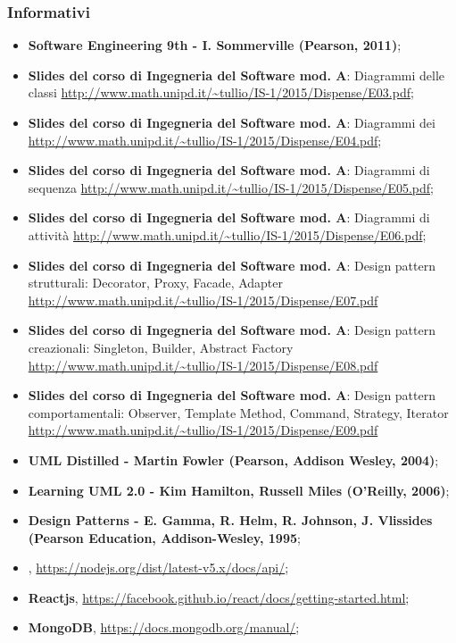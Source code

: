 \subsubsection{Informativi}
\begin{itemize}
\item \textbf{Software Engineering 9th - I. Sommerville (Pearson, 2011)};
\item \textbf{Slides del corso di Ingegneria del Software mod. A}: Diagrammi delle classi \url{http://www.math.unipd.it/~tullio/IS-1/2015/Dispense/E03.pdf};
\item \textbf{Slides del corso di Ingegneria del Software mod. A}: Diagrammi dei \url{http://www.math.unipd.it/~tullio/IS-1/2015/Dispense/E04.pdf};
\item \textbf{Slides del corso di Ingegneria del Software mod. A}: Diagrammi di sequenza \url{http://www.math.unipd.it/~tullio/IS-1/2015/Dispense/E05.pdf};
\item \textbf{Slides del corso di Ingegneria del Software mod. A}: Diagrammi di attività \url{http://www.math.unipd.it/~tullio/IS-1/2015/Dispense/E06.pdf};
\item \textbf{Slides del corso di Ingegneria del Software mod. A}: Design pattern strutturali: Decorator, Proxy, Facade, Adapter \url{http://www.math.unipd.it/~tullio/IS-1/2015/Dispense/E07.pdf}
\item \textbf{Slides del corso di Ingegneria del Software mod. A}: Design pattern creazionali: Singleton, Builder, Abstract Factory \url{http://www.math.unipd.it/~tullio/IS-1/2015/Dispense/E08.pdf}
\item \textbf{Slides del corso di Ingegneria del Software mod. A}: Design pattern comportamentali: Observer, Template Method, Command, Strategy, Iterator \url{http://www.math.unipd.it/~tullio/IS-1/2015/Dispense/E09.pdf}
\item \textbf{UML Distilled - Martin Fowler (Pearson, Addison Wesley, 2004)};
\item \textbf{Learning UML 2.0 - Kim Hamilton, Russell Miles (O’Reilly, 2006)};
\item \textbf{Design Patterns - E. Gamma, R. Helm, R. Johnson, J. Vlissides (Pearson Education, Addison-Wesley, 1995};
\item \textbf{}, \url{https://nodejs.org/dist/latest-v5.x/docs/api/};
\item \textbf{Reactjs}, \url{https://facebook.github.io/react/docs/getting-started.html};
\item \textbf{MongoDB}, \url{https://docs.mongodb.org/manual/};

\end{itemize}
